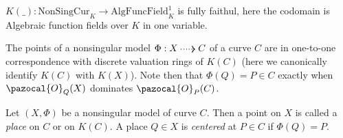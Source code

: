     \begin{corollary}
        $K(\_) : \mathrm{NonSingCur}_K \rightarrow \mathrm{AlgFuncField}_K^1$ is fully faithul, here the codomain is Algebraic function fields over $K$ in one variable.     
    \end{corollary}

    \begin{remark}
        The points of a nonsingular model $\Phi:X\dottedarrow C$ of a curve $C$ are in one-to-one correspondence with discrete valuation rings of $K(C)$ (here we canonically identify $K(C)$ with $K(X)$). Note then that $\Phi(Q)=P\in C$ exactly when $\pazocal{O}_Q(X)$ dominates $\pazocal{O}_P(C)$.
    \end{remark}
    \begin{definition}
        Let $(X,\Phi)$ be a nonsingular model of curve $C$. Then a point on $X$ is called a \emph{place} on $C$ or on $K(C)$. A place $Q\in X$ is \emph{centered} at $P\in C$ if $\Phi(Q)=P$.
    \end{definition}

